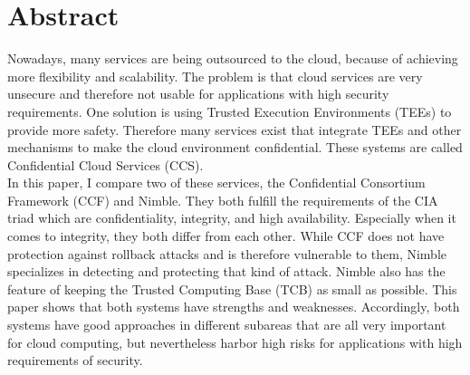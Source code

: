 \section*{Abstract}	
 Nowadays, many services are being outsourced to the cloud, because of achieving more flexibility and scalability. The problem is that cloud services are very unsecure and therefore not usable for applications with high security requirements. One solution is using Trusted Execution Environments (TEEs) to provide more safety. Therefore many services exist that integrate TEEs and other mechanisms to make the cloud environment confidential. These systems are called Confidential Cloud Services (CCS).\\
  In this paper, I compare two of these services, the Confidential Consortium Framework (CCF) and Nimble. They both fulfill the requirements of the CIA triad which are confidentiality, integrity, and high availability. Especially when it comes to integrity, they both differ from each other. While CCF does not have protection against rollback attacks and is therefore vulnerable to them, Nimble specializes in detecting and protecting that kind of attack. Nimble also has the feature of keeping the Trusted Computing Base (TCB) as small as possible. This paper shows that both systems have strengths and weaknesses. %
  Accordingly, both systems have good approaches in different subareas that are all very important for cloud computing, but nevertheless harbor high risks for applications with high requirements of security.\\